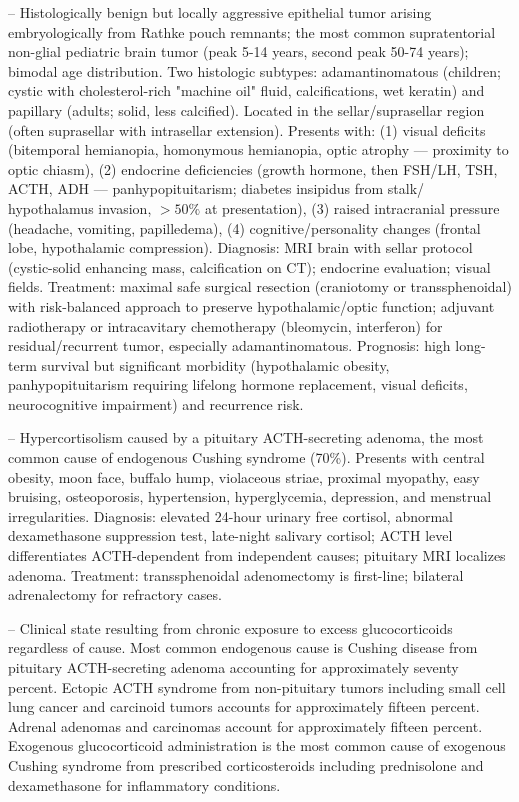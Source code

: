 -- Histologically benign but locally aggressive epithelial tumor arising embryologically from Rathke pouch remnants; the most common supratentorial non-glial pediatric brain tumor (peak 5-14 years, second peak 50-74 years); bimodal age distribution. Two histologic subtypes: adamantinomatous (children; cystic with cholesterol-rich "machine oil" fluid, calcifications, wet keratin) and papillary (adults; solid, less calcified). Located in the sellar/suprasellar region (often suprasellar with intrasellar extension). Presents with: (1) visual deficits (bitemporal hemianopia, homonymous hemianopia, optic atrophy — proximity to optic chiasm), (2) endocrine deficiencies (growth hormone, then FSH/LH, TSH, ACTH, ADH — panhypopituitarism; diabetes insipidus from stalk/ hypothalamus invasion, $> 50\%$ at presentation), (3) raised intracranial pressure (headache, vomiting, papilledema), (4) cognitive/personality changes (frontal lobe, hypothalamic compression). Diagnosis: MRI brain with sellar protocol (cystic-solid enhancing mass, calcification on CT); endocrine evaluation; visual fields. Treatment: maximal safe surgical resection (craniotomy or transsphenoidal) with risk-balanced approach to preserve hypothalamic/optic function; adjuvant radiotherapy or intracavitary chemotherapy (bleomycin, interferon) for residual/recurrent tumor, especially adamantinomatous. Prognosis: high long-term survival but significant morbidity (hypothalamic obesity, panhypopituitarism requiring lifelong hormone replacement, visual deficits, neurocognitive impairment) and recurrence risk.

-- Hypercortisolism caused by a pituitary ACTH-secreting adenoma, the most common cause of endogenous Cushing syndrome (70\%). Presents with central obesity, moon face, buffalo hump, violaceous striae, proximal myopathy, easy bruising, osteoporosis, hypertension, hyperglycemia, depression, and menstrual irregularities. Diagnosis: elevated 24-hour urinary free cortisol, abnormal dexamethasone suppression test, late-night salivary cortisol; ACTH level differentiates ACTH-dependent from independent causes; pituitary MRI localizes adenoma. Treatment: transsphenoidal adenomectomy is first-line; bilateral adrenalectomy for refractory cases.

-- Clinical state resulting from chronic exposure to excess glucocorticoids regardless of cause. Most common endogenous cause is Cushing disease from pituitary ACTH-secreting adenoma accounting for approximately seventy percent. Ectopic ACTH syndrome from non-pituitary tumors including small cell lung cancer and carcinoid tumors accounts for approximately fifteen percent. Adrenal adenomas and carcinomas account for approximately fifteen percent. Exogenous glucocorticoid administration is the most common cause of exogenous Cushing syndrome from prescribed corticosteroids including prednisolone and dexamethasone for inflammatory conditions.

